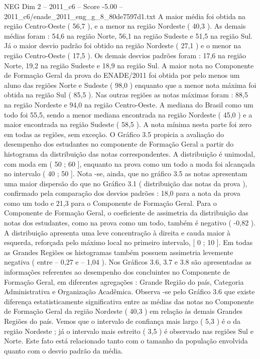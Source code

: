 \begin{textsample}{NEG Dim 2 – 2011\_c6 – Score -5.00 – 2011\_c6/enade\_2011\_eng\_g\_8\_80de7597d1.txt}
A maior média foi obtida na região Centro-Oeste ( 56,7 ), e a menor na região Nordeste ( 40,3 ).
As demais médias foram : 54,6 na região Norte, 56,1 na região Sudeste e 51,5 na região Sul.
Já o maior desvio padrão foi obtido na região Nordeste ( 27,1 ) e o menor na região Centro-Oeste ( 17,5 ).
Os demais desvios padrões foram : 17,6 na região Norte, 19,2 na região Sudeste e 18,9 na região Sul.
A maior nota no Componente de Formação Geral da prova do ENADE/2011 foi obtida por pelo menos um aluno das regiões Norte e Sudeste ( 98,0 ) enquanto que a menor nota máxima foi obtida na região Sul ( 85,5 ).
Nas outras regiões as notas máximas foram : 88,5 na região Nordeste e 94,0 na região Centro-Oeste.
A mediana do Brasil como um todo foi 55,5, sendo a menor mediana encontrada na região Nordeste ( 45,0 ) e a maior encontrada na região Sudeste ( 58,5 ).
A nota mínima nesta parte foi zero em todas as regiões, sem exceção.
O Gráfico 3.5 propicia a avaliação do desempenho dos estudantes no componente de Formação Geral a partir do histograma da distribuição das notas correspondentes.
A distribuição é unimodal, com moda em ( 50 ; 60 ], enquanto na prova como um todo a moda foi alcançada no intervalo ( 40 ; 50 ].
Nota -se, ainda, que no gráfico 3.5 as notas apresentam uma maior dispersão do que no Gráfico 3.1 ( distribuição das notas da prova ), confirmado pela comparação dos desvios padrões : 18,0 para a nota da prova como um todo e 21,3 para o Componente de Formação Geral.
Para o Componente de Formação Geral, o coeficiente de assimetria da distribuição das notas dos estudantes, como na prova como um todo, também é negativo ( -0,82 ).
A distribuição apresenta uma leve concentração à direita e cauda maior à esquerda, reforçada pelo máximo local no primeiro intervalo, [ 0 ; 10 ].
Em todas as Grandes Regiões os histogramas também possuem assimetria levemente negativa ( entre – 0,27 e – 1,04 ).
Nos Gráficos 3.6, 3.7 e 3.8 são apresentadas as informações referentes ao desempenho dos concluintes no Componente de Formação Geral, em diferentes agregações : Grande Região do país, Categoria Administrativa e Organização Acadêmica.
Observa -se pelo Gráfico 3.6 que existe diferença estatisticamente significativa entre as médias das notas no Componente de Formação Geral da região Nordeste ( 40,3 ) em relação às demais Grandes Regiões do país.
Vemos que o intervalo de confiança mais largo ( 5,3 ) é o da região Nordeste ; já o intervalo mais estreito ( 3,5 ) é observado nas regiões Sul e Norte.
Este fato está relacionado tanto com o tamanho da população envolvida quanto com o desvio padrão da média.

\end{textsample}
